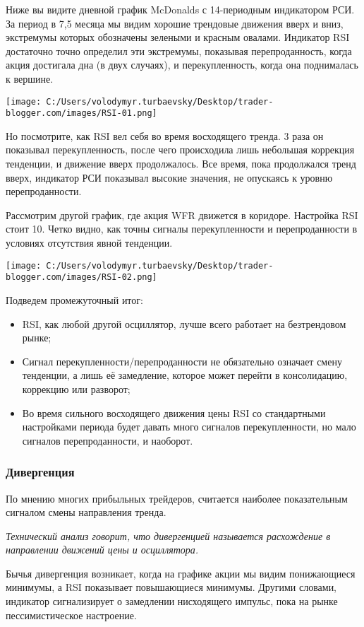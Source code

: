 \documentclass[a5paper]{article}
\begin{document}
Ниже вы видите дневной график McDonalds с 14-периодным индикатором РСИ. За период в 7,5 месяца мы видим хорошие трендовые движения вверх и вниз, экстремумы которых обозначены зелеными и красным овалами. Индикатор RSI достаточно точно определил эти экстремумы, показывая перепроданность, когда акция достигала дна (в двух случаях), и перекупленность, когда она поднималась к вершине.

\texttt{[image: C:/Users/volodymyr.turbaevsky/Desktop/trader-blogger.com/images/RSI-01.png]}

Но посмотрите, как RSI вел себя во время восходящего тренда. 3 раза он показывал перекупленность, после чего происходила лишь небольшая коррекция тенденции, и движение вверх продолжалось. Все время, пока продолжался тренд вверх, индикатор РСИ показывал высокие значения, не опускаясь к уровню перепроданности.

Рассмотрим другой график, где акция WFR движется в коридоре. Настройка
RSI стоит 10. Четко видно, как точны сигналы перекупленности и
перепроданности в условиях отсутствия явной тенденции.

\texttt{[image: C:/Users/volodymyr.turbaevsky/Desktop/trader-blogger.com/images/RSI-02.png]}

Подведем промежуточный итог:
\begin{itemize}
\item     RSI, как любой другой осциллятор, лучше всего работает на безтрендовом рынке;
\item     Сигнал перекупленности/перепроданности не обязательно означает смену тенденции, а лишь её замедление, которое может перейти в консолидацию, коррекцию или разворот;
\item     Во время сильного восходящего движения цены RSI со стандартными настройками периода будет давать много сигналов перекупленности, но мало сигналов перепроданности, и наоборот.
\end{itemize}

\subsubsection{Дивергенция}

По мнению многих прибыльных трейдеров, считается наиболее показательным сигналом смены направления тренда.

    \emph{Технический анализ говорит, что дивергенцией называется расхождение в направлении движений цены и осциллятора.}

Бычья дивергенция возникает, когда на графике акции мы видим понижающиеся минимумы, а RSI показывает повышающиеся минимумы. Другими словами, индикатор сигнализирует о замедлении нисходящего импульс, пока на рынке пессимистическое настроение.
\end{document}
